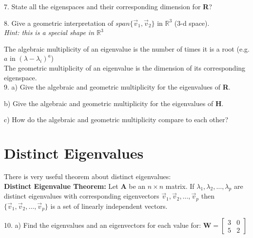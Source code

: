 \documentclass{article}
\begin{document}
\begin{flushleft}
\vspace{1.75in}

7. State all the eigenspaces and their corresponding dimension for \textbf{R}?

\vspace{1in}

8. Give a geometric interpretation of $span\{ \vec{v}_1 ,  \vec{v}_2 \}$ in $\mathbb{R}^3$ (3-d space). \\
\textit{Hint: this is a special shape in $\mathbb{R}^3$}

\vspace{1in}

The algebraic multiplicity of an eigenvalue is the number of times it is a root (e.g. $a$ in $(\lambda -\lambda_i)^a$)\\
The geometric multiplicity of an eigenvalue is the dimension of its corresponding eigenspace.\\
9. a) Give the algebraic and geometric multiplicity for the eigenvalues of \textbf{R}.

\vspace{0.75in}

\hspace{0.12in} b) Give the algebraic and geometric multiplicity for the eigenvalues of \textbf{H}.

\vspace{0.75in}

\hspace{0.12in} c) How do the algebraic and geometric multiplicity compare to each other?
\newpage

\section*{Distinct Eigenvalues}

There is very useful theorem about distinct eigenvalues:\\
\textbf{Distinct Eigenvalue Theorem:}
Let \textbf{A} be an $n \times n$ matrix. If $\lambda_1 , \lambda_2, \ldots , \lambda_p$ are distinct eigenvalues with corresponding eigenvectors $\vec{v}_1,\vec{v}_2, \ldots, \vec{v}_p$ then $\{ \vec{v}_1,\vec{v}_2, \ldots, \vec{v}_p \}$ is a set of linearly independent vectors. \\

\vspace{0.1in}

10. a) Find the eigenvalues and an eigenvectors for each value for: 
$\textbf{W}=
\begin{bmatrix}
3 & 0 \\
5 & 2 
\end{bmatrix}$


\end{flushleft}
\end{document}
